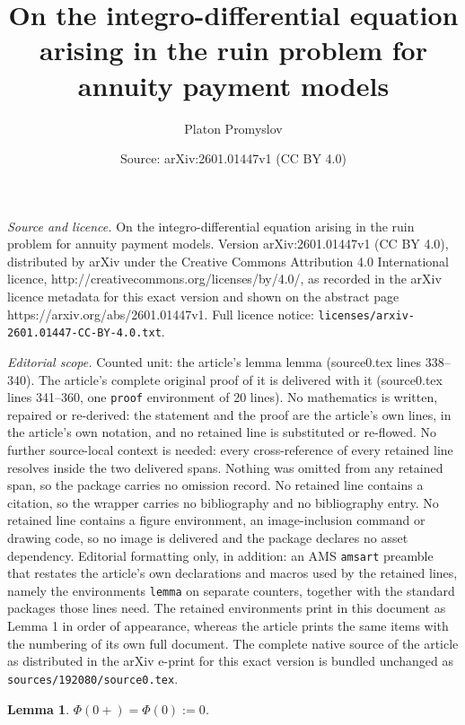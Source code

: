 \documentclass[10pt,a4paper]{amsart}
\title{On the integro-differential equation arising in the ruin problem for annuity payment models}
\author{Platon Promyslov}
\date{Source: arXiv:2601.01447v1 (CC BY 4.0)}
\newtheorem{lemma}{Lemma}
\begin{document}
\maketitle

\noindent\emph{Source and licence.} On the integro-differential equation arising in the ruin problem for annuity payment models. Version arXiv:2601.01447v1 (CC BY 4.0), distributed by arXiv under the Creative Commons Attribution 4.0 International licence, http://creativecommons.org/licenses/by/4.0/, as recorded in the arXiv licence metadata for this exact version and shown on the abstract page https://arxiv.org/abs/2601.01447v1. Full licence notice: \texttt{licenses/arxiv-2601.01447-CC-BY-4.0.txt}.\par\smallskip

\noindent\textit{Editorial scope.} Counted unit: the article's lemma lemma (source0.tex lines 338--340). The article's complete original proof of it is delivered with it (source0.tex lines 341--360, one \texttt{proof} environment of 20 lines). No mathematics is written, repaired or re-derived: the statement and the proof are the article's own lines, in the article's own notation, and no retained line is substituted or re-flowed.  No further source-local context is needed: every cross-reference of every retained line resolves inside the two delivered spans.  Nothing was omitted from any retained span, so the package carries no omission record.  No retained line contains a citation, so the wrapper carries no bibliography and no bibliography entry.  No retained line contains a figure environment, an image-inclusion command or drawing code, so no image is delivered and the package declares no asset dependency.  Editorial formatting only, in addition: an AMS \texttt{amsart} preamble that restates the article's own declarations and macros used by the retained lines, namely the environments \texttt{lemma} on separate counters, together with the standard packages those lines need.  The retained environments print in this document as Lemma 1 in order of appearance, whereas the article prints the same items with the numbering of its own full document.  The complete native source of the article as distributed in the arXiv e-print for this exact version is bundled unchanged as \texttt{sources/192080/source0.tex}.
\begin{lemma}
$\Phi(0+)=\Phi(0):=0$.
\end{lemma}
\end{document}
